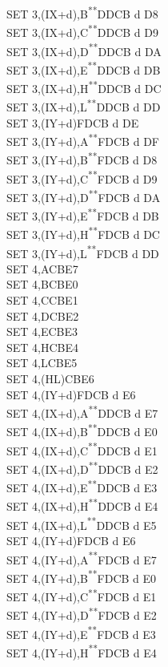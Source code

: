 \documentclass[12pt,twoside,openright,a4paper]{book}
\newcommand{\UNDOC}{\textnormal{\textsuperscript{**}}}
\begin{document}
\begin{multicols}{3}
{\begin{tabbing}
		SET 3,(IX+d),B\UNDOC\>DDCB d D8\\
		SET 3,(IX+d),C\UNDOC\>DDCB d D9\\
		SET 3,(IX+d),D\UNDOC\>DDCB d DA\\
		SET 3,(IX+d),E\UNDOC\>DDCB d DB\\
		SET 3,(IX+d),H\UNDOC\>DDCB d DC\\
		SET 3,(IX+d),L\UNDOC\>DDCB d DD\\
		SET 3,(IY+d)\>FDCB d DE\\
		SET 3,(IY+d),A\UNDOC\>FDCB d DF\\
		SET 3,(IY+d),B\UNDOC\>FDCB d D8\\
		SET 3,(IY+d),C\UNDOC\>FDCB d D9\\
		SET 3,(IY+d),D\UNDOC\>FDCB d DA\\
		SET 3,(IY+d),E\UNDOC\>FDCB d DB\\
		SET 3,(IY+d),H\UNDOC\>FDCB d DC\\
		SET 3,(IY+d),L\UNDOC\>FDCB d DD\\
		SET 4,A\>CBE7\\
		SET 4,B\>CBE0\\
		SET 4,C\>CBE1\\
		SET 4,D\>CBE2\\
		SET 4,E\>CBE3\\
		SET 4,H\>CBE4\\
		SET 4,L\>CBE5\\
		SET 4,(HL)\>CBE6\\
		SET 4,(IY+d)\>FDCB d E6\\
		SET 4,(IX+d),A\UNDOC\>DDCB d E7\\
		SET 4,(IX+d),B\UNDOC\>DDCB d E0\\
		SET 4,(IX+d),C\UNDOC\>DDCB d E1\\
		SET 4,(IX+d),D\UNDOC\>DDCB d E2\\
		SET 4,(IX+d),E\UNDOC\>DDCB d E3\\
		SET 4,(IX+d),H\UNDOC\>DDCB d E4\\
		SET 4,(IX+d),L\UNDOC\>DDCB d E5\\
		SET 4,(IY+d)\>FDCB d E6\\
		SET 4,(IY+d),A\UNDOC\>FDCB d E7\\
		SET 4,(IY+d),B\UNDOC\>FDCB d E0\\
		SET 4,(IY+d),C\UNDOC\>FDCB d E1\\
		SET 4,(IY+d),D\UNDOC\>FDCB d E2\\
		SET 4,(IY+d),E\UNDOC\>FDCB d E3\\
		SET 4,(IY+d),H\UNDOC\>FDCB d E4\\

\end{tabbing}}
\end{multicols}
\end{document}
